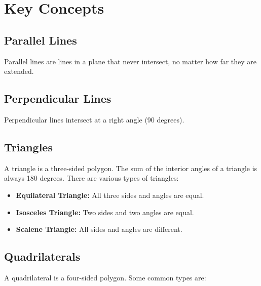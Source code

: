 \documentclass[12pt]{article}
\begin{document}

\section*{Key Concepts}

\subsection*{Parallel Lines}
Parallel lines are lines in a plane that never intersect, no matter how far they are extended.

\subsection*{Perpendicular Lines}
Perpendicular lines intersect at a right angle (90 degrees).

\subsection*{Triangles}
A triangle is a three-sided polygon. The sum of the interior angles of a triangle is always 180 degrees. There are various types of triangles:

\begin{itemize}
    \item \textbf{Equilateral Triangle:} All three sides and angles are equal.
    \item \textbf{Isosceles Triangle:} Two sides and two angles are equal.
    \item \textbf{Scalene Triangle:} All sides and angles are different.
\end{itemize}


\subsection*{Quadrilaterals}
A quadrilateral is a four-sided polygon. Some common types are:
\end{document}
